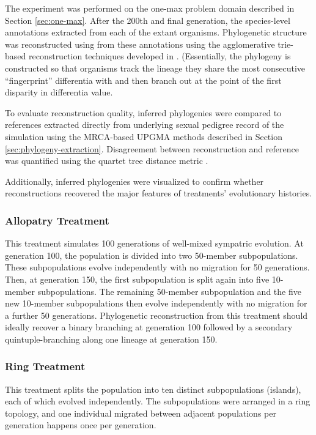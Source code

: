 The experiment was performed on the one-max problem domain described in Section \ref{sec:one-max}.
After the 200th and final generation, the species-level annotations extracted from each of the extant organisms.
Phylogenetic structure was reconstructed using from these annotations using the agglomerative trie-based reconstruction techniques developed in \citep{moreno2023toward}.
(Essentially, the phylogeny is constructed so that organisms track the lineage they share the most consecutive ``fingerprint'' differentia with and then branch out at the point of the first disparity in differentia value.

To evaluate reconstruction quality, inferred phylogenies were compared to references extracted directly from underlying sexual pedigree record of the simulation using the MRCA-based UPGMA methods described in Section \ref{sec:phylogeny-extraction}.
Disagreement between reconstruction and reference was quantified using the quartet tree distance metric \citep{estabrook1985comparison}.

Additionally, inferred phylogenies were visualized to confirm whether reconstructions recovered the major features of treatments' evolutionary histories.

\subsubsection{Allopatry Treatment}

This treatment simulates 100 generations of well-mixed sympatric evolution.
At generation 100, the population is divided into two 50-member subpopulations.
These subpopulations evolve independently with no migration for 50 generations.
Then, at generation 150, the first subpopulation is split again into five 10-member subpopulations.
The remaining 50-member subpopulation and the five new 10-member subpopulations then evolve independently with no migration for a further 50 generations.
Phylogenetic reconstruction from this treatment should ideally recover a binary branching at generation 100 followed by a secondary quintuple-branching along one lineage at generation 150.

\subsubsection{Ring Treatment}

This treatment splits the population into ten distinct subpopulations (islands), each of which evolved independently.
The subpopulations were arranged in a ring topology, and one individual migrated between adjacent populations per generation happens once per generation.

